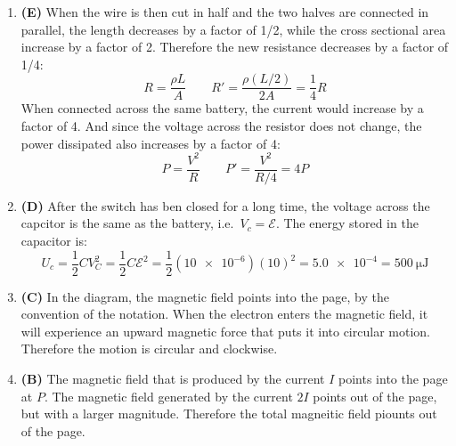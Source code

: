 \documentclass{../oss-handout}
\begin{document}
\begin{enumerate}[leftmargin=17pt]
\item\textbf{(E)} When the wire is then cut in half and the two halves are connected in parallel, the length decreases
by a factor of 1/2, while the cross sectional area increase by a factor of 2.
Therefore the new resistance decreases by a factor of 1/4:
\begin{displaymath}
  R=\frac{\rho L}A\quad\quad R'=\frac{\rho(L/2)}{2A}=\frac14R
\end{displaymath}
When connected across the same battery, the current would increase by a factor of 4. And since the voltage
across the resistor does not change, the power dissipated also increases by a factor of 4:
\begin{displaymath}
  P=\frac{V^2}R  \quad\quad P'=\frac{V^2}{R/4}=4P
\end{displaymath}

\item\textbf{(D)} After the switch has ben closed for a long time, the voltage across the capcitor is the same as the battery,
i.e.\ $V_c=\mathcal E$. The energy stored in the capacitor is:
\begin{displaymath}
U_c = \frac12CV_C^2=\frac12C\mathcal E^2=\frac12(\num{10e-6})(10)^2=\num{5.0e-4}=\boxed{\SI{500}{\micro\joule}}
\end{displaymath}


\item\textbf{(C)} In the diagram, the magnetic field points into the page, by the convention of the notation. When
the electron enters the magnetic field, it will experience an upward magnetic force that puts it into
circular motion. Therefore the motion is circular and clockwise.
  \begin{center}
  \end{center}

\item\textbf{(B)} The magnetic field that is produced by the current $I$ points into the page at $P$.
The magnetic field generated by the current $2I$ points out of the page, but with a larger
magnitude. Therefore the total magneitic field piounts out of the page.


\end{enumerate}
\end{document}
